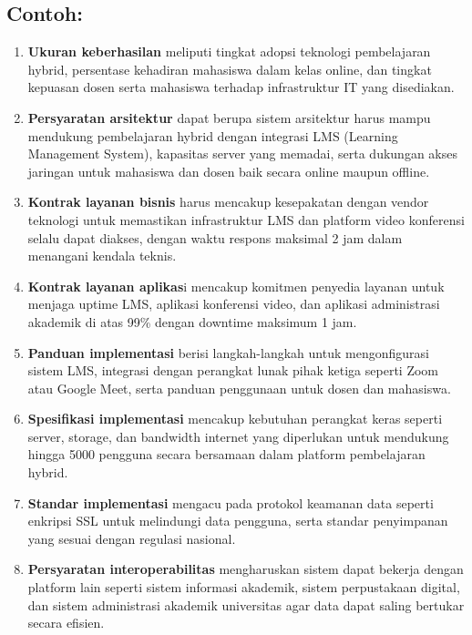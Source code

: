 \subsection{Contoh:}
\begin{enumerate}
	
	\item
	\textbf{Ukuran keberhasilan} meliputi tingkat adopsi teknologi pembelajaran hybrid, persentase kehadiran mahasiswa dalam kelas online, dan tingkat kepuasan dosen serta mahasiswa terhadap infrastruktur IT yang disediakan.
	
	\item
	\textbf{Persyaratan arsitektur} dapat berupa sistem arsitektur harus mampu mendukung pembelajaran hybrid dengan integrasi LMS (Learning Management System), kapasitas server yang memadai, serta dukungan akses jaringan untuk mahasiswa dan dosen baik secara online maupun offline.
	
	\item
	\textbf{Kontrak layanan bisnis }harus mencakup kesepakatan dengan vendor teknologi untuk memastikan infrastruktur LMS dan platform video konferensi selalu dapat diakses, dengan waktu respons maksimal 2 jam dalam menangani kendala teknis.
	
	\item
	\textbf{Kontrak layanan aplikas}i mencakup komitmen penyedia layanan untuk menjaga uptime LMS, aplikasi konferensi video, dan aplikasi administrasi akademik di atas 99\% dengan downtime maksimum 1 jam.
	
	\item
	\textbf{Panduan implementasi} berisi langkah-langkah untuk mengonfigurasi sistem LMS, integrasi dengan perangkat lunak pihak ketiga seperti Zoom atau Google Meet, serta panduan penggunaan untuk dosen dan mahasiswa.
	
	\item
	\textbf{Spesifikasi implementasi} mencakup kebutuhan perangkat keras seperti server, storage, dan bandwidth internet yang diperlukan untuk mendukung hingga 5000 pengguna secara bersamaan dalam platform pembelajaran hybrid.
	
	\item
	\textbf{Standar implementasi }mengacu pada protokol keamanan data seperti enkripsi SSL untuk melindungi data pengguna, serta standar penyimpanan yang sesuai dengan regulasi nasional.
	
	\item
	\textbf{Persyaratan interoperabilitas} mengharuskan sistem dapat bekerja dengan platform lain seperti sistem informasi akademik, sistem perpustakaan digital, dan sistem administrasi akademik universitas agar data dapat saling bertukar secara efisien.
	

\end{enumerate}

